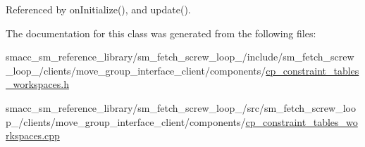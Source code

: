 Referenced by on\+Initialize(), and update().



The documentation for this class was generated from the following files\+:\begin{DoxyCompactItemize}
\item 
smacc\+\_\+sm\+\_\+reference\+\_\+library/sm\+\_\+fetch\+\_\+screw\+\_\+loop\+\_/include/sm\+\_\+fetch\+\_\+screw\+\_\+loop\+\_/clients/move\+\_\+group\+\_\+interface\+\_\+client/components/\hyperlink{sm__fetch__screw__loop__1_2include_2sm__fetch__screw__loop__1_2clients_2move__group__interface__eb937614fd7247d7c9113c75427badb8}{cp\+\_\+constraint\+\_\+tables\+\_\+workspaces.\+h}\item 
smacc\+\_\+sm\+\_\+reference\+\_\+library/sm\+\_\+fetch\+\_\+screw\+\_\+loop\+\_/src/sm\+\_\+fetch\+\_\+screw\+\_\+loop\+\_/clients/move\+\_\+group\+\_\+interface\+\_\+client/components/\hyperlink{sm__fetch__screw__loop__1_2src_2sm__fetch__screw__loop__1_2clients_2move__group__interface__cliea9127a8bf4c5b4aa0723f6a4b59a622c}{cp\+\_\+constraint\+\_\+tables\+\_\+workspaces.\+cpp}\end{DoxyCompactItemize}
